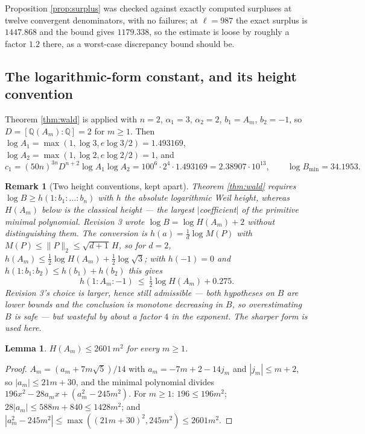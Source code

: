 \documentclass[11pt]{article}
\newtheorem{lemma}[theorem]{Lemma}
\newtheorem*{remark}{Remark}
\newcommand{\Q}{\mathbb{Q}}
\begin{document}
Proposition \ref{prop:surplus} was checked against exactly computed surpluses at twelve convergent
denominators, with no failures; at $\ell=987$ the exact surplus is $1447.868$ and the bound gives
$1179.338$, so the estimate is loose by roughly a factor $1.2$ there, as a worst-case discrepancy
bound should be.

\subsection{The logarithmic-form constant, and its height convention}

Theorem \ref{thm:wald} is applied with $n=2$, $\alpha_1=3$, $\alpha_2=2$, $b_1=A_m$, $b_2=-1$, so
$D=[\Q(A_m):\Q]=2$ for $m\ge1$. Then $\log A_1=\max(1,\log3,e\log3/2)=1.493169$,
$\log A_2=\max(1,\log2,e\log2/2)=1$, and
\[
  c_1=(50n)^{3n}D^{n+2}\log A_1\log A_2=100^6\cdot2^4\cdot1.493169=2.38907\cdot10^{13},
  \qquad \log B_{\min}=34.1953 .
\]

\begin{remark}[Two height conventions, kept apart]
\label{rem:heights}
Theorem \ref{thm:wald} requires $\log B\ge h(1:b_1:\dots:b_n)$ with $h$ the \emph{absolute
logarithmic Weil} height, whereas $H(A_m)$ below is the \emph{classical} height --- the largest
$|$coefficient$|$ of the primitive minimal polynomial. Revision 3 wrote $\log B=\log H(A_m)+2$ without
distinguishing them. The conversion is $h(a)=\tfrac1d\log M(P)$ with
$M(P)\le\lVert P\rVert_2\le\sqrt{d+1}\,H$, so for $d=2$, $h(A_m)\le\tfrac12\log H(A_m)+\tfrac12\log\sqrt3$;
with $h(-1)=0$ and $h(1:b_1:b_2)\le h(b_1)+h(b_2)$ this gives
\[
  h(1:A_m:-1)\ \le\ \tfrac12\log H(A_m)+0.275 .
\]
Revision 3's choice is \emph{larger}, hence still admissible --- both hypotheses on $B$ are lower
bounds and the conclusion is monotone decreasing in $B$, so overestimating $B$ is safe --- but
wasteful by about a factor $4$ in the exponent. The sharper form is used here.
\end{remark}

\begin{lemma}
\label{lem:heightbound}
$H(A_m)\le2601\,m^2$ for every $m\ge1$.
\end{lemma}

\begin{proof}
$A_m=(a_m+7m\sqrt5)/14$ with $a_m=-7m+2-14j_m$ and $|j_m|\le m+2$, so $|a_m|\le21m+30$, and the
minimal polynomial divides $196x^2-28a_mx+(a_m^2-245m^2)$. For $m\ge1$: $196\le196m^2$;
$28|a_m|\le588m+840\le1428m^2$; and $|a_m^2-245m^2|\le\max((21m+30)^2,245m^2)\le2601m^2$.
\end{proof}
\end{document}
